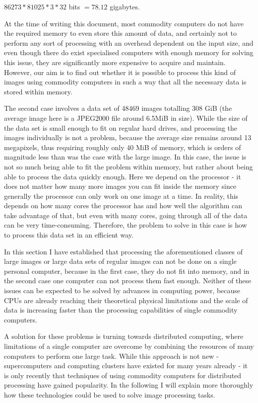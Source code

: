 \documentclass [12pt,a4paper]{report}
\begin{document}
\begin{center}
$ 86273 * 81025 * 3 * 32$ bits $ = 78.12 $ gigabytes.
\end{center}

At the time of writing this document, most commodity computers do not have the required memory to even store this amount of data, and certainly not to perform any sort of processing with an overhead dependent on the input size, and even though there do exist specialised computers with enough memory for solving this issue, they are significantly more expensive to acquire and maintain. However, our aim is to find out whether it is possible  to process this kind of images using commodity computers in such a way that all the necessary data is stored within memory.

The second case involves a data set of 48469 images totalling 308 GiB (the average image here is a JPEG2000 file around 6.5MiB in size). While the size of the data set is small enough to fit on regular hard drives, and processing the images individually is not a problem, because the average size remains around 13 megapixels, thus requiring roughly only 40 MiB of memory, which is orders of magnitude less than was the case with the large image. In this case, the issue is not so much being able to fit the problem within memory, but rather about being able to process the data quickly enough. Here we depend on the processor - it does not matter how many more images you can fit inside the memory since generally the processor can only work on one image at a time. In reality, this depends on how many cores the processor has and how well the algorithm can take advantage of that, but even with many cores, going through all of the data can be very time-consuming. Therefore, the problem to solve in this case is how to process this data set in an efficient way.

In this section I have established that processing the aforementioned classes of large images or large data sets of regular images can not be done on a single personal computer, because in the first case, they do not fit into memory, and in the second case one computer can not process them fast enough. Neither of these issues can be expected to be solved by advances in computing power, because CPUs are already reaching their theoretical physical limitations  and the scale of data is increasing faster than the processing capabilities of single commodity computers. 

A solution for these problems is turning towards distributed computing, where limitations of a single computer are overcome by combining the resources of many computers to perform one large task. While this approach is not new - supercomputers and computing clusters have existed for many years already - it is only recently that techniques of using commodity computers for distributed processing have gained popularity. In the following I will explain more thoroughly how these technologies could be used to solve image processing tasks.
\end{document}
